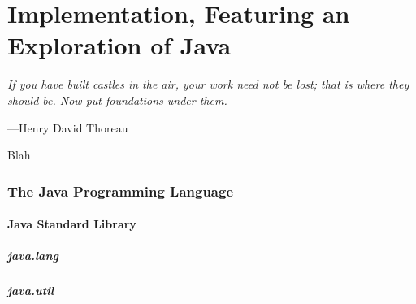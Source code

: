 
\part*{Implementation, Featuring an Exploration of Java}

\vspace{4mm}
\begin{displayquote}
	\textit{If you have built castles in the air, your work need not be lost; that is where they should be. Now put foundations under them.}
	\begin{flushright}
		---Henry David Thoreau
	\end{flushright}
\end{displayquote}
\vspace{4mm}


Blah \\


\toclineskip
\section{The Java Programming Language}


\subsection{Java Standard Library}

\subsubsection{java.lang}

\subsubsection{java.util}

